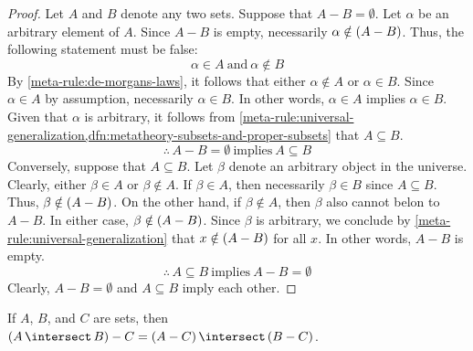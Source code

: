 \begin{proof}
    Let \( A \) and \( B \) denote any two sets.
    Suppose that \( A - B = \emptyset \).
    Let \( \alpha \) be an arbitrary element of \( A \).
    Since \( A - B \) is empty, necessarily \( \alpha \notin \mleft( A - B \mright) \).
    Thus, the following statement must be false:
    \begin{equation*}
        \alpha \in A \ \text{and} \ \alpha \notin B
    \end{equation*}
    By \cref{meta-rule:de-morgans-laws}, it follows that either \( \alpha \notin A \) or \( \alpha \in B \).
    Since \( \alpha \in A \) by assumption, necessarily \( \alpha \in B \).
    In other words, \( \alpha \in A \) implies \( \alpha \in B \).
    Given that \( \alpha \) is arbitrary, it follows from \cref{meta-rule:universal-generalization,dfn:metatheory-subsets-and-proper-subsets} that
    \( A \subseteq B \).
    \begin{equation*}
        \therefore \, A - B = \emptyset \ \text{implies} \ A \subseteq B
    \end{equation*}
    Conversely, suppose that \( A \subseteq B \).
    Let \( \beta \) denote an arbitrary object in the universe.
    Clearly, either \( \beta \in A \) or \( \beta \notin A \).
    If \( \beta \in A \), then necessarily \( \beta \in B \) since \( A \subseteq B \).
    Thus, \( \beta \notin \mleft( A - B \mright) \).
    On the other hand, if \( \beta \notin A \), then \( \beta \) also cannot belon to \( A - B \).
    In either case, \( \beta \notin \mleft( A - B \mright) \).
    Since \( \beta \) is arbitrary, we conclude by \cref{meta-rule:universal-generalization} that \( x \notin \mleft( A - B \mright) \)
    for all \( x \). In other words, \( A - B \) is empty.
    \begin{equation*}
        \therefore \, A \subseteq B \ \text{implies} \ A - B = \emptyset
    \end{equation*}
    Clearly, \( A - B = \emptyset \) and \( A \subseteq B \) imply each other.
\end{proof}

\begin{thm}
     \label{thm:metatheory-right-distributivity-of-difference-over-intersection}
    If \( A \), \( B \), and \( C \) are sets, then \( \mleft( A \,{\intersect}\, B \mright) - C = \mleft( A - C \mright) \,{\intersect}\, \mleft( B - C \mright) \).
\end{thm}

